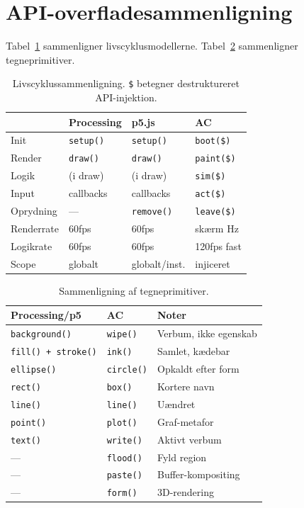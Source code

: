 \documentclass[10pt,letterpaper,twocolumn]{article}
\begin{document}
\section{API-overfladesammenligning}
\label{sec:comparison}

Tabel~\ref{tab:lifecycle} sammenligner livscyklusmodellerne. Tabel~\ref{tab:drawing} sammenligner tegneprimitiver.

\begin{table}[h]
\small
\centering
\begin{tabularx}{\columnwidth}{lXXX}
\toprule
 & \textbf{Processing} & \textbf{p5.js} & \textbf{AC} \\
\midrule
Init & \texttt{setup()} & \texttt{setup()} & \texttt{boot(\$)} \\
Render & \texttt{draw()} & \texttt{draw()} & \texttt{paint(\$)} \\
Logik & (i draw) & (i draw) & \texttt{sim(\$)} \\
Input & callbacks & callbacks & \texttt{act(\$)} \\
Oprydning & --- & \texttt{remove()} & \texttt{leave(\$)} \\
\midrule
Renderrate & 60fps & 60fps & skærm Hz \\
Logikrate & 60fps & 60fps & 120fps fast \\
Scope & globalt & globalt/inst. & injiceret \\
\bottomrule
\end{tabularx}
\caption{Livscyklussammenligning. \texttt{\$} betegner destruktureret API-injektion.}
\label{tab:lifecycle}
\end{table}

\begin{table}[h]
\small
\centering
\begin{tabularx}{\columnwidth}{lXX}
\toprule
\textbf{Processing/p5} & \textbf{AC} & \textbf{Noter} \\
\midrule
\texttt{background()} & \texttt{wipe()} & Verbum, ikke egenskab \\
\texttt{fill() + stroke()} & \texttt{ink()} & Samlet, kædebar \\
\texttt{ellipse()} & \texttt{circle()} & Opkaldt efter form \\
\texttt{rect()} & \texttt{box()} & Kortere navn \\
\texttt{line()} & \texttt{line()} & Uændret \\
\texttt{point()} & \texttt{plot()} & Graf-metafor \\
\texttt{text()} & \texttt{write()} & Aktivt verbum \\
--- & \texttt{flood()} & Fyld region \\
--- & \texttt{paste()} & Buffer-kompositing \\
--- & \texttt{form()} & 3D-rendering \\
\bottomrule
\end{tabularx}
\caption{Sammenligning af tegneprimitiver.}
\label{tab:drawing}
\end{table}
\end{document}
